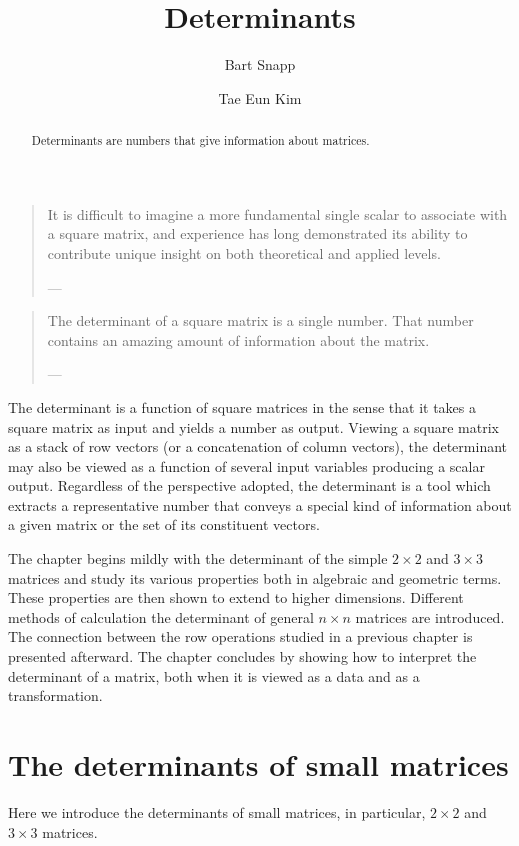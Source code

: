 \documentclass{ximera}
\author{Bart Snapp \and Tae Eun Kim}
\title{Determinants}
\begin{document}
\begin{abstract}
  Determinants are numbers that give information about matrices.
\end{abstract}
\maketitle

\begin{quote}
  It is difficult to imagine a more fundamental single scalar to
  associate with a square matrix, and experience has long demonstrated
  its ability to contribute unique insight on both theoretical and
  applied levels.

  \hfill ---
\end{quote}

\begin{quote}
  The determinant of a square matrix is a single number. That number
  contains an amazing amount of information about the matrix.

  \hfill ---
\end{quote}

The determinant is a function of square matrices in the sense that it
takes a square matrix as input and yields a number as output. Viewing
a square matrix as a stack of row vectors (or a concatenation of
column vectors), the determinant may also be viewed as a function of
several input variables producing a scalar output. Regardless of the
perspective adopted, the determinant is a tool which extracts a
representative number that conveys a special kind of information about a
given matrix or the set of its constituent vectors.

The chapter begins mildly with the determinant of the simple
$2 \times 2$ and $3 \times 3$ matrices and study its various properties both in
algebraic and geometric terms. These properties are then shown to
extend to higher dimensions. Different methods of calculation the
determinant of general $n \times n$ matrices are introduced. The connection
between the row operations studied in a previous chapter is presented
afterward. The chapter concludes by showing how to interpret the
determinant of a matrix, both when it is viewed as a data and as a
transformation.

\section{The determinants of small matrices}
Here we introduce the determinants of small matrices, in particular, $2 \times 2$ and $3 \times 3$ matrices.
\end{document}
